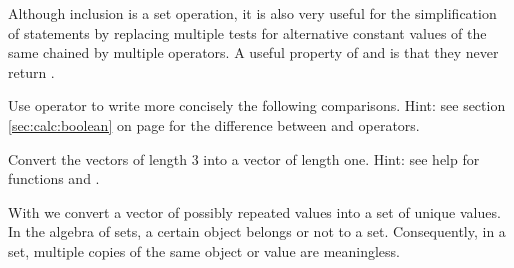 \documentclass[krantz2]{krantz}\usepackage{knitr}
\begin{document}
Although inclusion is a set operation, it is also very useful for the simplification of  statements by replacing multiple tests for alternative constant values of the same  chained by multiple \Roperator{|} operators. A useful property of  and  is that they never return .

\begin{playground}
Use operator  to write more concisely the following comparisons. Hint: see section \ref{sec:calc:boolean} on page \pageref{sec:calc:boolean} for the difference between \code{|} and \code{||} operators.

\begin{knitrout}\footnotesize
{}\color{fgcolor}\begin{kframe}
\begin{alltt}
 \hlkwb{<-} \hlstd{(}\hlstd{,} \hlstd{,} \hlstd{)}
 \hlopt{==}  \hlopt{|}  \hlopt{==}  \hlopt{|}  \hlopt{==}  \hlopt{|}  \hlopt{==} 
\end{alltt}
\end{kframe}
\end{knitrout}

Convert the  vectors of length 3 into a vector of length one. Hint: see help for functions  and .
\end{playground}

With  we convert a vector of possibly repeated values into a set of unique values. In the algebra of sets, a certain object belongs or not to a set. Consequently, in a set, multiple copies of the same object or value are meaningless.

\begin{knitrout}\footnotesize
{}\color{fgcolor}
\end{knitrout}
\end{document}
